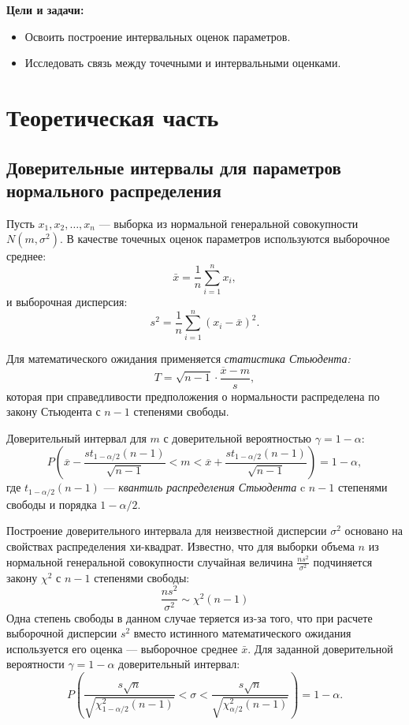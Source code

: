 \documentclass[a4paper, 14pt]{extarticle}
\begin{document}
\textbf{Цели и задачи:}
\begin{itemize}
    \item Освоить построение интервальных оценок параметров.
    \item Исследовать связь между точечными и интервальными оценками.
\end{itemize}

\section{Теоретическая часть}

\subsection{Доверительные интервалы для параметров нормального распределения}

Пусть $x_1, x_2, \dots, x_n$ --- выборка из нормальной генеральной совокупности $N(m, \sigma^2)$. В качестве точечных оценок параметров используются выборочное среднее:
\begin{equation*}
    \bar{x} = \frac{1}{n} \sum_{i=1}^{n} x_i,
\end{equation*}
и выборочная дисперсия:
\begin{equation*}
    s^2 = \frac{1}{n} \sum_{i=1}^{n} (x_i - \bar{x})^2.
\end{equation*}

Для математического ожидания применяется \textit{статистика Стьюдента:}
\begin{equation*}
    T=\sqrt{n-1}\cdot\frac{\overline{x}-m}{s},
\end{equation*}
которая при справедливости предположения о нормальности распределена по закону Стьюдента с $n-1$ степенями свободы. 

Доверительный интервал для $m$ с доверительной вероятностью $\gamma = 1 - \alpha$:
\begin{equation*}
    P\left(\overline{x}-\frac{st_{1-\alpha/2}(n-1)}{\sqrt{n-1}}<m<\overline{x}+\frac{st_{1-\alpha/2}(n-1)}{\sqrt{n-1}}\right)=1-\alpha,
\end{equation*}
где $t_{1-\alpha/2}(n-1)$ --- \textit{квантиль распределения Стьюдента} c $n-1$ степенями свободы и порядка $1-\alpha/2$. 

Построение доверительного интервала для неизвестной дисперсии $\sigma^2$ основано на свойствах распределения хи-квадрат. Известно, что для выборки объема $n$ из нормальной генеральной совокупности случайная величина $\frac{n s^2}{\sigma^2}$ подчиняется закону $\chi^2$ с $n-1$ степенями свободы:$$\frac{n s^2}{\sigma^2} \sim \chi^2(n-1)$$ Одна степень свободы в данном случае теряется из-за того, что при расчете выборочной дисперсии $s^2$ вместо истинного математического ожидания используется его оценка — выборочное среднее $\bar{x}$. Для заданной доверительной вероятности $\gamma = 1 - \alpha$ доверительный интервал:
\begin{equation*}
    P\left(\frac{s\sqrt{n}}{\sqrt{\chi_{1-\alpha/2}^2(n-1)}}<\sigma<\frac{s\sqrt{n}}{\sqrt{\chi_{\alpha/2}^2(n-1)}}\right)=1-\alpha.
\end{equation*}
\end{document}
